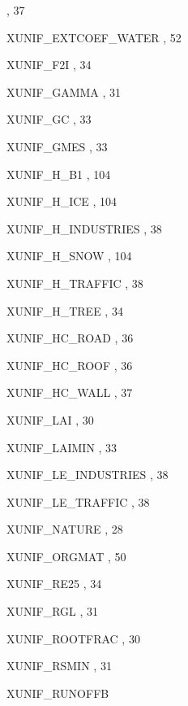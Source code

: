 \begin{theindex}
    \subitem {},  37
  \item XUNIF\_EXTCOEF\_WATER
    \subitem {},  52
  \item XUNIF\_F2I
    \subitem {},  34
  \item XUNIF\_GAMMA
    \subitem {},  31
  \item XUNIF\_GC
    \subitem {},  33
  \item XUNIF\_GMES
    \subitem {},  33
  \item XUNIF\_H\_B1
    \subitem {},  104
  \item XUNIF\_H\_ICE
    \subitem {},  104
  \item XUNIF\_H\_INDUSTRIES
    \subitem {},  38
  \item XUNIF\_H\_SNOW
    \subitem {},  104
  \item XUNIF\_H\_TRAFFIC
    \subitem {},  38
  \item XUNIF\_H\_TREE
    \subitem {},  34
  \item XUNIF\_HC\_ROAD
    \subitem {},  36
  \item XUNIF\_HC\_ROOF
    \subitem {},  36
  \item XUNIF\_HC\_WALL
    \subitem {},  37
  \item XUNIF\_LAI
    \subitem {},  30
  \item XUNIF\_LAIMIN
    \subitem {},  33
  \item XUNIF\_LE\_INDUSTRIES
    \subitem {},  38
  \item XUNIF\_LE\_TRAFFIC
    \subitem {},  38
  \item XUNIF\_NATURE
    \subitem {},  28
  \item XUNIF\_ORGMAT
    \subitem {},  50
  \item XUNIF\_RE25
    \subitem {},  34
  \item XUNIF\_RGL
    \subitem {},  31
  \item XUNIF\_ROOTFRAC
    \subitem {},  30
  \item XUNIF\_RSMIN
    \subitem {},  31
  \item XUNIF\_RUNOFFB

\end{theindex}
